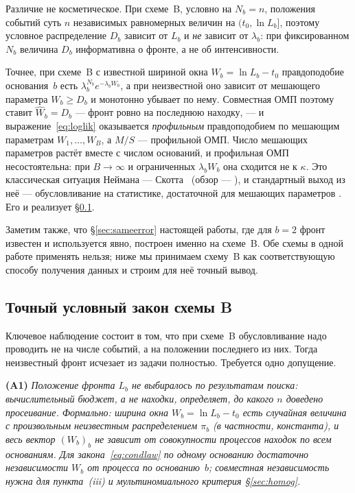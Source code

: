 \documentclass[11pt,a4paper]{article}
\theoremstyle{plain}
\theoremstyle{remark}
\begin{document}
Различие не косметическое. При схеме~B, условно на $N_b=n$, положения событий суть
$n$ независимых равномерных величин на $(t_0,\ln L_b]$, поэтому условное распределение
$D_b$ зависит от $L_b$ и \emph{не} зависит от $\lambda_b$: при фиксированном $N_b$
величина $D_b$ информативна о фронте, а не об интенсивности.

Точнее, при схеме~B с известной шириной окна $W_b=\ln L_b-t_0$ правдоподобие
основания~$b$ есть $\lambda_b^{N_b}e^{-\lambda_bW_b}$, а при неизвестной оно
зависит от мешающего параметра $W_b\ge D_b$ и монотонно убывает по нему. Совместная
ОМП поэтому ставит $\hat W_b=D_b$ --- фронт ровно на последнюю находку, --- и
выражение~\eqref{eq:loglik} оказывается \emph{профильным} правдоподобием по
мешающим параметрам $W_1,\dots,W_B$, а $M/S$ --- профильной ОМП. Число мешающих
параметров растёт вместе с числом оснований, и профильная ОМП несостоятельна:
при $B\to\infty$ и ограниченных $\lambda_bW_b$ она сходится не к $\kappa$. Это
классическая ситуация Неймана --- Скотта~\cite{neymanscott1948}
(обзор --- \cite{lancaster2000}), и стандартный выход из неё --- обусловливание
на статистике, достаточной для мешающих параметров
\cite{kalbfleischsprott1970,andersen1970}. Его и реализует \S\ref{sec:exact}.

Заметим также, что \S\ref{sec:sameerror} настоящей работы, где для $b=2$ фронт известен
и используется явно, построен именно на схеме~B. Обе схемы в одной работе применять
нельзя; ниже мы принимаем схему~B как соответствующую способу получения данных
и строим для неё точный вывод.

\subsection{Точный условный закон схемы B}\label{sec:exact}

Ключевое наблюдение состоит в том, что при схеме~B обусловливание надо проводить
не на числе событий, а на положении последнего из них. Тогда неизвестный фронт
исчезает из задачи полностью. Требуется одно допущение.

\medskip
\noindent\textbf{(A1)} \emph{Положение фронта $L_b$ не выбиралось по результатам поиска:
вычислительный бюджет, а не находки, определяет, до какого $n$ доведено просеивание.
Формально: ширина окна $W_b=\ln L_b-t_0$ есть случайная величина с произвольным
неизвестным распределением $\pi_b$ (в частности, константа), и весь вектор
$(W_b)_b$ не зависит от совокупности процессов находок по всем основаниям. Для
закона~\eqref{eq:condlaw} по одному основанию достаточно независимости $W_b$ от
процесса по основанию~$b$; совместная независимость нужна для
пункта~(iii) и мультиномиального критерия \S\ref{sec:homog}.}
\end{document}
